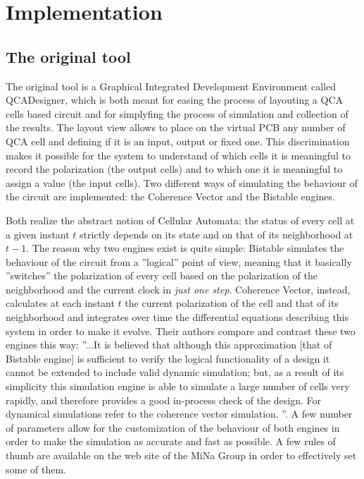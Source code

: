 \chapter{Implementation}\label{sec:implementation}
\section {The original tool}
The original tool is a Graphical Integrated Development Environment called QCADesigner, which is both meant for easing the process of layouting a QCA cells based circuit and for simplyfing the process of simulation and collection of the results. The layout view allows to place on the virtual PCB any number of QCA cell and defining if it is an input, output or fixed one. This discrimination makes it possible for the system to understand of which cells it is meaningful to record the polarization (the output cells) and to which one it is meaningful to assign a value (the input cells). Two different ways of simulating the behaviour of the circuit are implemented: the Coherence Vector and the Bistable engines. 

Both realize the abstract notion of Cellular Automata: the status of every cell at a given instant $t$ strictly depends on its state and on that of its neighborhood at $t-1$. The reason why two engines exist is quite simple: Bistable simulates the behaviour of the circuit from a ''logical'' point of view, meaning that it basically ''switches'' the polarization of every cell based on the polarization of the neighborhood and the current clock in \textsl{just one step}. Coherence Vector, instead, calculates at each instant $t$ the current polarization of the cell and that of its neighborhood and integrates over time the differential equations describing this system in order to make it evolve. Their authors compare and contrast these two engines this way: ''...It is believed that although this approximation [that of Bistable engine] is sufficient to verify the logical functionality of a design it cannot be extended to include valid dynamic simulation; but, as a result of its simplicity this simulation engine is able to simulate a large number of cells very rapidly, and therefore provides a good in-process check of the design. For dynamical simulations refer to the coherence vector simulation. ''. A few number of parameters allow for the customization of the behaviour of both engines in order to make the simulation as accurate and fast as possible. A few rules of thumb are available on the web site of the MiNa Group in order to effectively set some of them.

